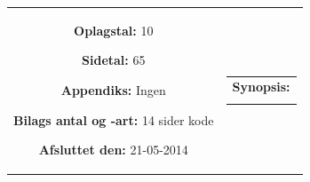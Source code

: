 \begin{titlepage}
\begin{nopagebreak}
{\begin{tabular}{cc}
{\begin{description}
						\item {\bf Oplagstal:} 10
						\item {\bf Sidetal:} 65
						\item {\bf Appendiks:} Ingen
						\item {\bf Bilags antal og -art:} 14 sider kode
						\item {\bf Afsluttet den:} 21-05-2014
					\end{description}
					\vfill
				} &
				\parbox{7cm}{
					\vspace{.15cm}
					\hfill 
					\begin{tabular}{l}
						{\bf Synopsis:}\bigskip \\
						\fbox{
							\parbox{6.5cm}{\smallskip
								{\vfill{\small 
								\smallskip}}
							}
						}
  					\end{tabular}
  				}
			\end{tabular}
		}\\
		\\
	\end{nopagebreak}
\end{titlepage}
